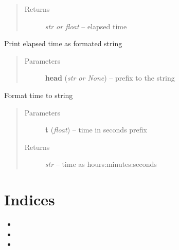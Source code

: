 \documentclass[letterpaper,10pt,english]{sphinxmanual}
\begin{document}
\begin{fulllineitems}
\begin{fulllineitems}
\begin{quote}
\begin{description}
\item[{Returns}] \leavevmode
\emph{str or float} --
elapsed time

\end{description}\end{quote}

\end{fulllineitems}


\begin{fulllineitems}
\label{api/ClearMap.Utils:ClearMap.Utils.Timer.Timer.printElapsedTime}
Print elapsed time as formated string
\begin{quote}\begin{description}
\item[{Parameters}] \leavevmode
\textbf{head} (\emph{str or None}) --
prefix to the string

\end{description}\end{quote}

\end{fulllineitems}


\begin{fulllineitems}
\label{api/ClearMap.Utils:ClearMap.Utils.Timer.Timer.formatElapsedTime}
Format time to string
\begin{quote}\begin{description}
\item[{Parameters}] \leavevmode
\textbf{t} (\emph{float}) --
time in seconds prefix

\item[{Returns}] \leavevmode
\emph{str} --
time as hours:minutes:seconds

\end{description}\end{quote}

\end{fulllineitems}


\end{fulllineitems}



\chapter{Indices}
\label{index:indices}\begin{itemize}
\item {} 

\item {} 

\item {} 

\end{itemize}
\end{document}
